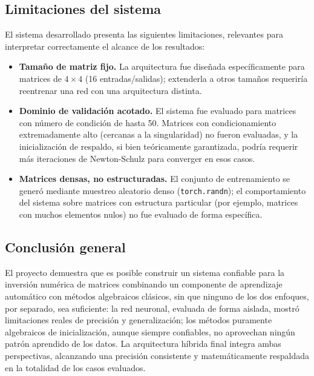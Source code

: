 \documentclass[12pt,a4paper]{article}
\begin{document}
\subsection{Limitaciones del sistema}

El sistema desarrollado presenta las siguientes limitaciones, relevantes para interpretar correctamente el alcance de los resultados:

\begin{itemize}
    \item \textbf{Tamaño de matriz fijo.} La arquitectura fue diseñada específicamente para matrices de $4\times4$ (16 entradas/salidas); extenderla a otros tamaños requeriría reentrenar una red con una arquitectura distinta.
    \item \textbf{Dominio de validación acotado.} El sistema fue evaluado para matrices con número de condición de hasta 50. Matrices con condicionamiento extremadamente alto (cercanas a la singularidad) no fueron evaluadas, y la inicialización de respaldo, si bien teóricamente garantizada, podría requerir más iteraciones de Newton-Schulz para converger en esos casos.
    \item \textbf{Matrices densas, no estructuradas.} El conjunto de entrenamiento se generó mediante muestreo aleatorio denso (\texttt{torch.randn}); el comportamiento del sistema sobre matrices con estructura particular (por ejemplo, matrices con muchos elementos nulos) no fue evaluado de forma específica.
\end{itemize}

\subsection{Conclusión general}

El proyecto demuestra que es posible construir un sistema confiable para la inversión numérica de matrices combinando un componente de aprendizaje automático con métodos algebraicos clásicos, sin que ninguno de los dos enfoques, por separado, sea suficiente: la red neuronal, evaluada de forma aislada, mostró limitaciones reales de precisión y generalización; los métodos puramente algebraicos de inicialización, aunque siempre confiables, no aprovechan ningún patrón aprendido de los datos. La arquitectura híbrida final integra ambas perspectivas, alcanzando una precisión consistente y matemáticamente respaldada en la totalidad de los casos evaluados.
\end{document}
